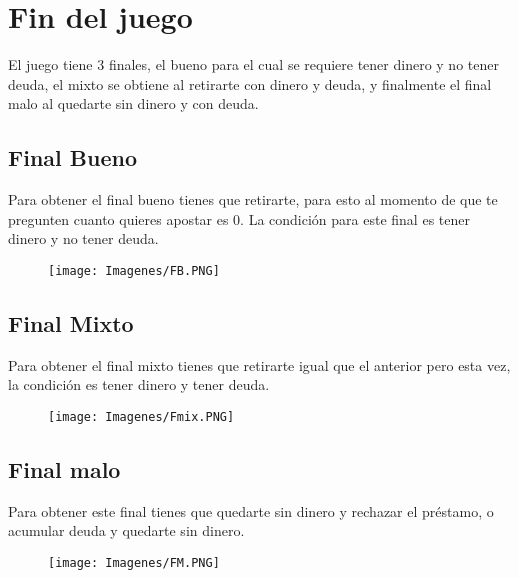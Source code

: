\section{Fin del juego}

El juego tiene 3 finales, el bueno para el cual se requiere tener dinero y no tener deuda, el mixto se obtiene al retirarte con dinero y deuda, y finalmente el final malo al quedarte sin dinero y con deuda.

\subsection{Final Bueno}

Para obtener el final bueno tienes que retirarte, para esto al momento de que te pregunten cuanto quieres apostar es 0. La condición para este final es tener dinero y no tener deuda.

\begin{figure}[h]
    \raggedright
    \texttt{[image: Imagenes/FB.PNG]}
\end{figure}

\subsection{Final Mixto}

Para obtener el final mixto tienes que retirarte igual que el anterior pero esta vez, la condición es tener dinero y tener deuda.

\begin{figure}[h]
    \raggedright
    \texttt{[image: Imagenes/Fmix.PNG]}
\end{figure}

\subsection{Final malo}

Para obtener este final tienes que quedarte sin dinero y rechazar el préstamo, o acumular deuda y quedarte sin dinero.

\begin{figure}[h]
    \raggedright
    \texttt{[image: Imagenes/FM.PNG]}
\end{figure}

\newpage